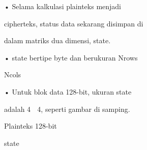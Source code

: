 \documentclass{article}
\begin{document}

• Selama kalkulasi plainteks menjadi 

cipherteks, status data sekarang disimpan di 

dalam matriks dua dimensi, state. 

• state bertipe byte dan berukuran Nrows  

Ncols 

• Untuk blok data 128-bit, ukuran state 

adalah 4  4, seperti gambar di samping.

Plainteks 128-bit

state
\end{document}
